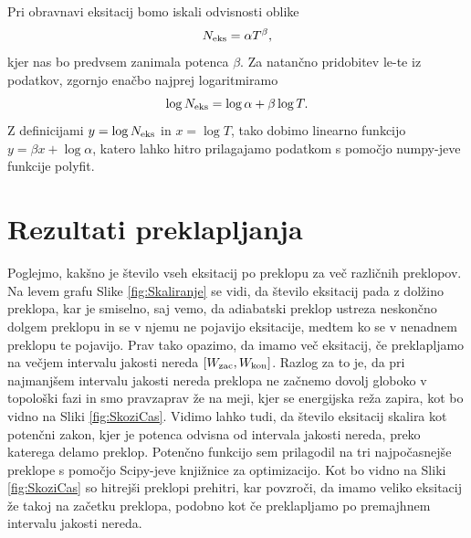 Pri obravnavi eksitacij bomo iskali odvisnosti oblike 
\begin{equation}
N_{\textup{eks}} = \alpha T^{\beta},
\end{equation}
kjer nas bo predvsem zanimala potenca $\beta$. Za natančno pridobitev le-te iz podatkov, zgornjo enačbo najprej logaritmiramo
\begin{equation}
\log N_{\textup{eks}} = \log \alpha + \beta \log T.
\end{equation}
Z definicijami $y=\log N_{\textup{eks}}$ in $x=\log T$, tako dobimo linearno funkcijo $y=\beta x + \log \alpha$, katero lahko hitro prilagajamo podatkom s pomočjo numpy-jeve funkcije polyfit.

\chapter{Rezultati preklapljanja}
Poglejmo, kakšno je število vseh eksitacij po preklopu za več različnih preklopov. Na levem grafu Slike \ref{fig:Skaliranje} se vidi, da število eksitacij pada z dolžino preklopa, kar je smiselno, saj vemo, da adiabatski preklop ustreza neskončno dolgem preklopu in se v njemu ne pojavijo eksitacije, medtem ko se v nenadnem preklopu te pojavijo.
Prav tako opazimo, da imamo več eksitacij, če preklapljamo na večjem intervalu jakosti nereda $[W_{\textup{zac}}, W_{\textup{kon}}]$. Razlog za to je, da pri najmanjšem intervalu jakosti nereda preklopa ne začnemo dovolj globoko v topološki fazi in smo pravzaprav že na meji, kjer se energijska reža zapira, kot bo vidno na Sliki \ref{fig:SkoziCas}. Vidimo lahko tudi, da število eksitacij skalira kot potenčni zakon, kjer je potenca odvisna od intervala jakosti nereda, preko katerega delamo preklop. Potenčno funkcijo sem prilagodil na tri najpočasnejše preklope s pomočjo Scipy-jeve knjižnice za optimizacijo. Kot bo vidno na Sliki \ref{fig:SkoziCas} so hitrejši preklopi prehitri, kar povzroči, da imamo veliko eksitacij že takoj na začetku preklopa, podobno kot če preklapljamo po premajhnem intervalu jakosti nereda.
